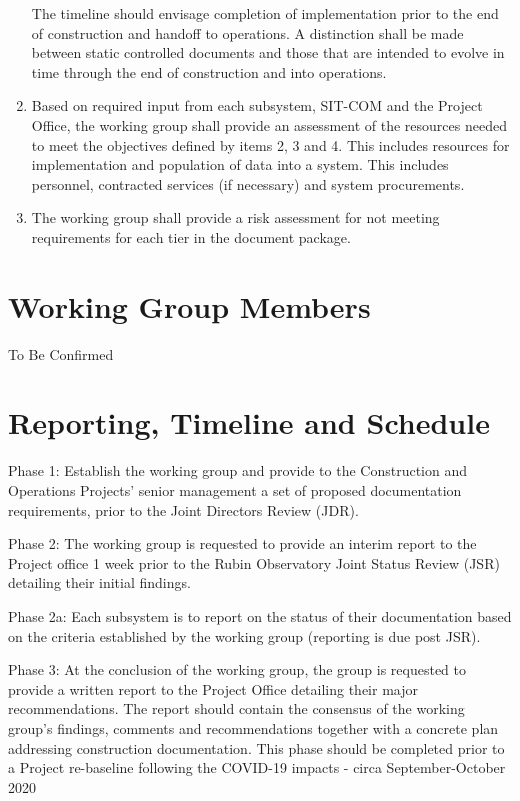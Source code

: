 \documentclass[SE,authoryear,toc]{lsstdoc}
\begin{document}
\begin{enumerate}
{The timeline should envisage completion  of implementation prior to the end of construction and handoff to operations.
A distinction shall be made between static controlled documents and those that are intended to evolve in time through the end of construction and into operations. }
\item {Based on required input from each subsystem, SIT-COM and the Project Office, the working group shall provide an assessment of the resources needed to meet the objectives defined by items 2, 3 and 4.
This includes resources for implementation and population of data into a system.
This includes personnel, contracted services (if necessary) and system procurements.}
\item{The working group shall provide a risk assessment for not meeting requirements for each tier in the document package.}
\end{enumerate}

\section{Working Group Members}

To Be Confirmed

\section{Reporting, Timeline and Schedule}
Phase 1: Establish the working group and provide to the Construction and Operations Projects' senior management a set of proposed documentation requirements, prior to the Joint Directors Review (JDR).

Phase 2: The working group is requested to provide an interim report to the Project office 1 week prior to the Rubin Observatory Joint Status Review (JSR) detailing their initial findings. 

Phase 2a:  Each subsystem is to report on the status of their documentation based on the criteria established by the working group (reporting is due post JSR).

Phase 3: At the conclusion of the working group,  the group is requested to provide a written report to the Project Office detailing their major recommendations.  The report
should contain the consensus of the working group's findings, comments and recommendations together with a concrete plan addressing construction documentation.  This phase should be completed prior to a Project re-baseline following the COVID-19 impacts - circa September-October 2020
\end{document}
